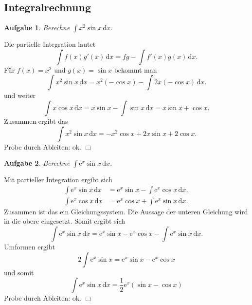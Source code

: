 \documentclass[a4paper,10pt,fleqn,twoside]{scrartcl}
\numberwithin{equation}{section}
\newcommand{\ee}{\mathrm e}
\newcommand{\strong}[1]{{\normalfont\sffamily\bfseries #1}}
\theoremstyle{Aufgabe}
\newtheorem{Aufgabe}{\sffamily Aufgabe}[section]
\begin{document}
\newpage

\subsection{Integralrechnung}
\begin{Aufgabe}
Berechne $\displaystyle\int x^2\sin x\,\mathrm dx$.
\end{Aufgabe}
\noindent\strong{Lösung.}
Die partielle Integration lautet
\begin{equation}
\int f(x)g'(x)\,\mathrm dx = fg-\int f'(x)g(x)\,\mathrm dx.
\end{equation}
Für $f(x)=x^2$ und $g(x)=\sin x$ bekommt man
\begin{equation}
\int x^2\sin x\,\mathrm dx = x^2(-\cos x) - \int 2x(-\cos x)\,\mathrm dx.
\end{equation}
und weiter
\begin{equation}
\int x\cos x\,\mathrm dx = x\sin x - \int \sin x\,\mathrm dx = x\sin x + \cos x.
\end{equation}
Zusammen ergibt das
\begin{equation}
\int x^2\sin x\,\mathrm dx = -x^2\cos x +2x\sin x+2\cos x.
\end{equation}
Probe durch Ableiten: ok. $\Box$

\begin{Aufgabe}
Berechne $\displaystyle\int\ee^x\sin x\,\mathrm dx$.
\end{Aufgabe}

\noindent\strong{Lösung.}
Mit partieller Integration ergibt sich
\begin{align}
\int \ee^x\sin x\,\mathrm dx &= \ee^x\sin x - \int \ee^x\cos x\,\mathrm dx,\\
\int \ee^x\cos x\,\mathrm dx &= \ee^x\cos x + \int \ee^x\sin x\,\mathrm dx.
\end{align}
Zusammen ist das ein Gleichungssystem. Die Aussage der unteren
Gleichung wird in die obere eingesetzt. Somit ergibt sich
\begin{equation}
\int \ee^x\sin x\,\mathrm dx = \ee^x\sin x - \ee^x\cos x - \int \ee^x\sin x\,\mathrm dx.
\end{equation}
Umformen ergibt
\begin{equation}
2\int \ee^x\sin x = \ee^x\sin x-\ee^x\cos x
\end{equation}
und somit
\begin{equation}
\int \ee^x\sin x\,\mathrm dx = \frac{1}{2}\ee^x(\sin x-\cos x)
\end{equation}
Probe durch Ableiten: ok. $\Box$
\end{document}
